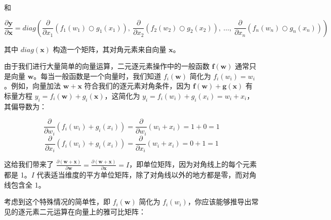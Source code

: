 \documentclass[lang=cn,newtx,10pt,scheme=chinese]{elegantbook}
\begin{document}
和

\[\frac{\partial \mathbf{y}}{\partial \mathbf{x}} = diag \left( \frac{\partial}{\partial x_1}(f_{1}(w_1) \bigcirc g_{1}(x_1)),~ \frac{\partial}{\partial x_2}(f_{2}(w_2) \bigcirc g_{2}(x_2)),~ \ldots,~ \frac{\partial}{\partial x_n}(f_{n}(w_n) \bigcirc g_{n}(x_n)) \right)\]

其中 $diag(\mathbf{x})$ 构造一个矩阵，其对角元素来自向量 $\mathbf{x}$。

由于我们进行大量简单的向量运算，二元逐元素操作中的一般函数 $\mathbf{f(w)}$ 通常只是向量 $\mathbf{w}$。每当一般函数是一个向量时，我们知道 $f_i(\mathbf{w})$ 简化为 $f_i(w_i) = w_i$。例如，向量加法 $\mathbf{w + x}$ 符合我们的逐元素对角条件，因为 $\mathbf{f(w)} + \mathbf{g(x)}$ 有标量方程 $y_i = f_i(\mathbf{w}) + g_i(\mathbf{x})$，这简化为 $y_i = f_i(w_i) + g_i(x_i) = w_i + x_i$，其偏导数为：

\[\frac{\partial}{\partial w_i} ( f_{i}(w_i) + g_{i}(x_i) ) = \frac{\partial}{\partial w_i}(w_i + x_i) = 1 + 0 = 1\]\[\frac{\partial}{\partial x_i} ( f_{i}(w_i) + g_{i}(x_i) ) = \frac{\partial}{\partial x_i}(w_i + x_i) = 0 + 1 = 1\]

这给我们带来了 $\frac{\partial (\mathbf{w+x})}{\partial \mathbf{w}} = \frac{\partial (\mathbf{w+x})}{\partial \mathbf{x}} = I$，即单位矩阵，因为对角线上的每个元素都是 1。$I$ 代表适当维度的平方单位矩阵，除了对角线以外的地方都是零，而对角线包含全 1。

考虑到这个特殊情况的简单性，即 $f_i(\mathbf{w})$ 简化为 $f_i(w_i)$，你应该能够推导出常见的逐元素二元运算在向量上的雅可比矩阵：
\end{document}
